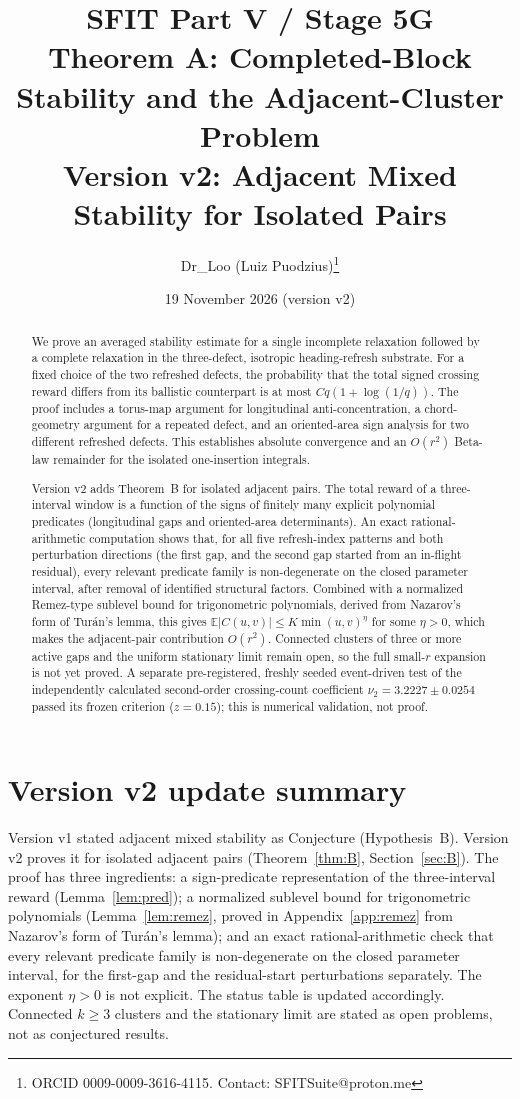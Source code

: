 \documentclass[11pt]{article}
\title{SFIT Part V / Stage 5G\\Theorem A: Completed-Block Stability and the Adjacent-Cluster Problem\\[4pt]\large Version v2: Adjacent Mixed Stability for Isolated Pairs}
\author{Dr\_Loo (Luiz Puodzius)\thanks{ORCID 0009-0009-3616-4115. Contact: SFITSuite@proton.me}}
\date{19 November 2026 (version v2)}
\theoremstyle{remark}\newtheorem{remark}[theorem]{Remark}
\newcommand{\E}{\mathbb E}
\begin{document}
\maketitle

\begin{abstract}
We prove an averaged stability estimate for a single incomplete relaxation followed by a complete relaxation in the three-defect, isotropic heading-refresh substrate. For a fixed choice of the two refreshed defects, the probability that the total signed crossing reward differs from its ballistic counterpart is at most $Cq(1+\log(1/q))$. The proof includes a torus-map argument for longitudinal anti-concentration, a chord-geometry argument for a repeated defect, and an oriented-area sign analysis for two different refreshed defects. This establishes absolute convergence and an $O(r^2)$ Beta-law remainder for the isolated one-insertion integrals. 

Version v2 adds Theorem~B for isolated adjacent pairs. The total reward of a three-interval window is a function of the signs of finitely many explicit polynomial predicates (longitudinal gaps and oriented-area determinants). An exact rational-arithmetic computation shows that, for all five refresh-index patterns and both perturbation directions (the first gap, and the second gap started from an in-flight residual), every relevant predicate family is non-degenerate on the closed parameter interval, after removal of identified structural factors. Combined with a normalized Remez-type sublevel bound for trigonometric polynomials, derived from Nazarov's form of Turán's lemma, this gives $\E|C(u,v)|\le K\min(u,v)^\eta$ for some $\eta>0$, which makes the adjacent-pair contribution $O(r^2)$. Connected clusters of three or more active gaps and the uniform stationary limit remain open, so the full small-$r$ expansion is not yet proved. A separate pre-registered, freshly seeded event-driven test of the independently calculated second-order crossing-count coefficient $\nu_2=3.2227\pm0.0254$ passed its frozen criterion ($z=0.15$); this is numerical validation, not proof.
\end{abstract}

\section*{Version v2 update summary}
Version v1 stated adjacent mixed stability as Conjecture (Hypothesis~B). Version v2 proves it for isolated adjacent pairs (Theorem~\ref{thm:B}, Section~\ref{sec:B}). The proof has three ingredients: a sign-predicate representation of the three-interval reward (Lemma~\ref{lem:pred}); a normalized sublevel bound for trigonometric polynomials (Lemma~\ref{lem:remez}, proved in Appendix~\ref{app:remez} from Nazarov's form of Turán's lemma); and an exact rational-arithmetic check that every relevant predicate family is non-degenerate on the closed parameter interval, for the first-gap and the residual-start perturbations separately. The exponent $\eta>0$ is not explicit. The status table is updated accordingly. Connected $k\ge3$ clusters and the stationary limit are stated as open problems, not as conjectured results.
\end{document}
